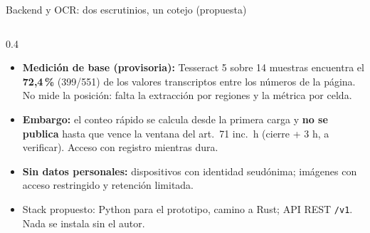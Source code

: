 \documentclass[aspectratio=169,11pt]{beamer}
\begin{document}
\begin{frame}{Backend y OCR: dos escrutinios, un cotejo (propuesta)}
\begin{columns}[T]
\begin{column}{0.4\textwidth}
\begin{itemize}
        \item \textbf{Medición de base (provisoria):} Tesseract 5 sobre 14 muestras encuentra el \textbf{72,4\,\%} (399/551) de los valores transcriptos entre los números de la página. No mide la posición: falta la extracción por regiones y la métrica por celda.
        \item \textbf{Embargo:} el conteo rápido se calcula desde la primera carga y \textbf{no se publica} hasta que vence la ventana del art.\ 71 inc.\ h (cierre + 3 h, a verificar). Acceso con registro mientras dura.
        \item \textbf{Sin datos personales:} dispositivos con identidad seudónima; imágenes con acceso restringido y retención limitada.
        \item Stack propuesto: Python para el prototipo, camino a Rust; API REST \texttt{/v1}. Nada se instala sin el autor.
      \end{itemize}
    \end{column}
  \end{columns}
\end{frame}
\end{document}
